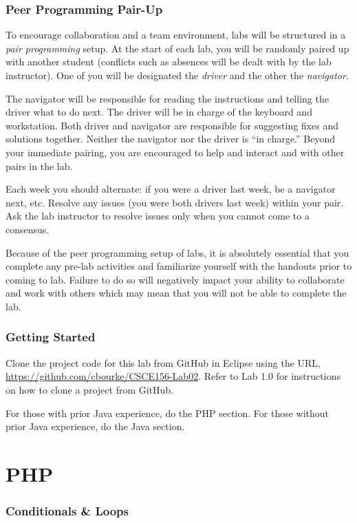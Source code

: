 \documentclass[12pt]{scrartcl}
\begin{document}
\section*{Peer Programming Pair-Up}

To encourage collaboration and a team environment, labs will be
structured in a \emph{pair programming} setup.  At the start of
each lab, you will be randomly paired up with another student 
(conflicts such as absences will be dealt with by the lab instructor).
One of you will be designated the \emph{driver} and the other
the \emph{navigator}.  

The navigator will be responsible for reading the instructions and
telling the driver what to do next.  The driver will be in charge of the
keyboard and workstation.  Both driver and navigator are responsible
for suggesting fixes and solutions together.  Neither the navigator
nor the driver is ``in charge.''  Beyond your immediate pairing, you
are encouraged to help and interact and with other pairs in the lab.

Each week you should alternate: if you were a driver last week, 
be a navigator next, etc.  Resolve any issues (you were both drivers
last week) within your pair.  Ask the lab instructor to resolve issues
only when you cannot come to a consensus.  

Because of the peer programming setup of labs, it is absolutely 
essential that you complete any pre-lab activities and familiarize
yourself with the handouts prior to coming to lab.  Failure to do
so will negatively impact your ability to collaborate and work with 
others which may mean that you will not be able to complete the
lab.  

\section*{Getting Started}

Clone the project code for this lab from GitHub in Eclipse using the
URL, \url{https://github.com/cbourke/CSCE156-Lab02}.
Refer to Lab 1.0 for instructions on how to clone a project from GitHub.

For those with prior Java experience, do the PHP section.  For those
without prior Java experience, do the Java section.

\part*{PHP}

\section*{Conditionals \& Loops}
\end{document}

